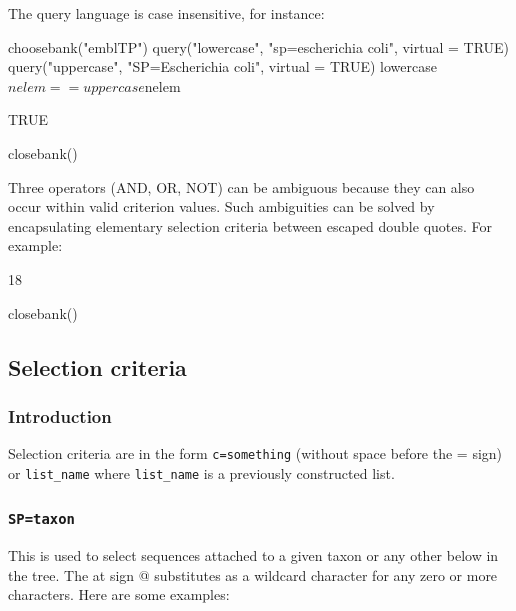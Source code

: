 \documentclass{article}
\begin{document}
The query language is case insensitive, for instance:

\begin{Schunk}
\begin{Sinput}
 choosebank("emblTP")
 query("lowercase", "sp=escherichia coli", virtual = TRUE)
 query("uppercase", "SP=Escherichia coli", virtual = TRUE)
 lowercase$nelem == uppercase$nelem
\end{Sinput}
\begin{Soutput}
[1] TRUE
\end{Soutput}
\begin{Sinput}
 closebank()
\end{Sinput}
\end{Schunk}

Three operators (AND, OR, NOT) 
can be ambiguous because they can also occur within valid criterion values. 
Such ambiguities can be solved by encapsulating elementary selection 
criteria between escaped double quotes. For example:

\begin{Schunk}
\begin{Soutput}
[1] 18
\end{Soutput}
\begin{Sinput}
 closebank()
\end{Sinput}
\end{Schunk}

\subsection{Selection criteria}

\subsubsection{Introduction}

Selection criteria are in the form \texttt{c=something} (without space
before the = sign) or \texttt{list\_name} where \texttt{list\_name} is a
previously constructed list.

\subsubsection{\texttt{SP=taxon}}

This is used to select sequences attached to a given taxon or any other below in
the tree. The at sign @ substitutes as a wildcard character for any zero or more 
characters. Here are some examples:
\end{document}
